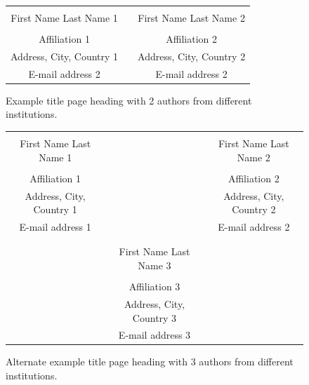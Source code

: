 \documentclass{scspaperproc}
\theoremstyle{scsthe}
\begin{document}
\begin{figure}[htb]
{
\centering
\begin{tabular}{ccc}
\phantom{Entries to adjust spacing - ignore} & \phantom{intermediate space} & \phantom{Entries to adjust spacing - ignore} \\
First Name Last Name 1 & & First Name Last Name 2 \\
\\
Affiliation 1 & & Affiliation 2 \\
Address, City, Country 1 & & Address, City, Country 2 \\
E-mail address 2 & & E-mail address 2 
\end{tabular}
\caption{Example title page heading with 2 authors from different institutions.\label{fig2different}}
}
\end{figure}

\begin{figure}[htb]
{
\centering
\begin{tabular}{ccc}
\phantom{This adjusts spacing - ignore} & \phantom{This adjusts spacing - ignore} & \phantom{This adjusts spacing - ignore} \\
First Name Last Name 1 & & First Name Last Name 2 \\
\\
Affiliation 1 & & Affiliation 2 \\
Address, City, Country 1 & & Address, City, Country 2 \\
E-mail address 1 & & E-mail address 2 \\
\\ \\
& First Name Last Name 3 \\
\\
& Affiliation 3\\
& Address, City, Country 3\\
& E-mail address 3 
\end{tabular}
\caption{Alternate example title page heading with 3 authors from different institutions. \label{fig3different}}
}
\end{figure}
\end{document}
